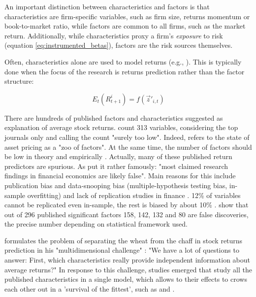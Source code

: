 						
			An important distinction between characteristics and factors is that characteristics are firm-specific variables, such as firm size, returns momentum or book-to-market ratio, while factors are common to all firms, such as the market return. Additionally, while characteristics proxy a firm's \textit{exposure} to risk (equation \ref{eq:instrumented_betas}), factors are the risk sources themselves. 
			
			Often, characteristics alone are used to model returns (e.g., \cite{gu2020empirical, bryzgalova2019forest, tobek2020does}). This is typically done when the focus of the research is returns prediction rather than the factor structure:
			
			\begin{equation}
				E_t(R^i_{t+1}) = f(\vec{z}'_{i,t})
			\end{equation}
			
			
			There are hundreds of published factors and characteristics suggested as explanation of average stock returns. \cite{harvey2016and} count 313 variables, considering the top journals only and calling the count "surely too low". Indeed, \cite{cochrane2011presidential} refers to the state of asset pricing as a "zoo of factors". At the same time, the number of factors should be low in theory \citep{cochrane2011presidential} and empirically \citep{ahn2012determining}. Actually, many of these published return predictors are spurious. As \cite[p.~5]{harvey2016and} put it rather famously: "most claimed research findings in financial economics are likely false". Main reasons for this include publication bias and data-snooping bias (multiple-hypothesis testing bias, in-sample overfitting) and lack of replication studies in finance \citep{harvey2016and, mclean2016does}. 12\% of variables cannot be replicated even in-sample, the rest is biased by about 10\% \citep{mclean2016does}. \cite{harvey2016and} show that out of 296 published significant factors 158, 142, 132 and 80 are false discoveries, the precise number depending on statistical framework used.
			
			\citeauthor{cochrane2011presidential} formulates the problem of separating the wheat from the chaff in stock returns prediction in his "multidimensional challenge" \citep[p.~1060]{cochrane2011presidential}: "We have a lot of questions to answer: First, which characteristics really provide independent information about average returns?" In response to this challenge, studies emerged that study all the published characteristics in a single model, which allows to their effects to crows each other out in a 'survival of the fittest', such as \cite{gu2020empirical} and \cite{tobek2020does}. 
		
